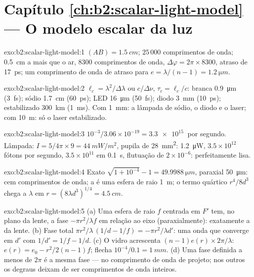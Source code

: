 \section*{Capítulo \ref{ch:b2:scalar-light-model} --- O modelo escalar da luz}

\begin{solution}{exo:b2:scalar-light-model:1}
$(AB) = \qty{1.5}{cm}$; $25\,000$ comprimentos de onda; \qty{0.5}{cm} a mais que o ar, $8300$
comprimentos de onda, $\Delta\varphi = 2\pi \times 8300$, atraso de \qty{17}{ps}; um comprimento de onda de
atraso para $e = \lambda/(n - 1) = \qty{1.2}{\micro m}$.
\end{solution}

\begin{solution}{exo:b2:scalar-light-model:2}
$\ell_c = \lambda^2/\Delta\lambda$ ou $c/\Delta\nu$, $\tau_c = \ell_c/c$: branca \qty{0.9}{\micro m} (\qty{3}{fs});
sódio \qty{1.7}{cm} (\qty{60}{ps}); LED \qty{16}{\micro m} (\qty{50}{fs}); diodo \qty{3}{mm}
(\qty{10}{ps}); estabilizado \qty{300}{km} (\qty{1}{ms}). Com \qty{1}{mm}: a lâmpada de sódio,
o diodo e o laser; com \qty{10}{m}: só o laser estabilizado.
\end{solution}

\begin{solution}{exo:b2:scalar-light-model:3}
$10^{-3}/3.06 \times 10^{-19} = \qty{3.3e15}{}$ por segundo. Lâmpada: $I = 5/4\pi \times 9 =
\qty{44}{mW/m^2}$, pupila de \qty{28}{mm^2}: \qty{1.2}{\micro W}, $3.5 \times 10^{12}$ fótons por segundo,
$3.5 \times 10^{11}$ em \qty{0.1}{s}, flutuação de $2 \times 10^{-6}$: perfeitamente lisa.
\end{solution}

\begin{solution}{exo:b2:scalar-light-model:4}
Exato $\sqrt{1 + 10^{-4}} - 1 = \qty{49.9988}{\micro m}$, paraxial \qty{50}{\micro m}: cem
comprimentos de onda; a  é uma esfera de raio \qty{1}{m}; o
termo quártico $r^4/8d^3$ chega a $\lambda$ em $r = (8\lambda d^3)^{1/4} = \qty{4.5}{cm}$.
\end{solution}

\begin{solution}{exo:b2:scalar-light-model:5}
(a) Uma esfera de raio $f$ centrada em $F'$ tem, no plano da lente, a
fase $-\pi r^2/\lambda f$ em relação ao eixo (paraxialmente): exatamente a
da lente. (b) Fase total $\pi r^2/\lambda\,(1/d - 1/f) = -\pi r^2/\lambda d'$: uma onda
que converge em $d'$ com $1/d' = 1/f - 1/d$. (c) O vidro acrescenta $(n - 1)e(r)
\times2\pi/\lambda$: $e(r) = e_0 - r^2/2(n - 1)f$; flecha $10^{-4}/0.1 = \qty{1}{mm}$. (d) Uma
fase definida a menos de $2\pi$ é a mesma fase --- no comprimento de onda
de projeto; nos outros os degraus deixam de ser comprimentos de onda inteiros.
\end{solution}

